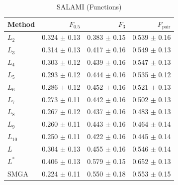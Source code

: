 \documentclass{article}
\begin{document}
\begin{table}
\centering
\caption{ SALAMI (Functions)\label{results:salami:func}}
\small
\begin{tabular}{lrrr}
\toprule
Method & $F_{0.5}$ & $F_3$ & $F_\text{pair}$\\
\midrule
$L_2$   & 0.324 $\pm$ 0.13 & 0.383 $\pm$ 0.15   & 0.539 $\pm$ 0.16\\
$L_3$   & 0.314 $\pm$ 0.13 & 0.417 $\pm$ 0.16   & 0.549 $\pm$ 0.13\\
$L_4$   & 0.303 $\pm$ 0.12 & 0.439 $\pm$ 0.16   & 0.547 $\pm$ 0.13\\
$L_5$   & 0.293 $\pm$ 0.12 & 0.444 $\pm$ 0.16   & 0.535 $\pm$ 0.12\\
$L_6$   & 0.286 $\pm$ 0.12 & 0.452 $\pm$ 0.16   & 0.521 $\pm$ 0.13\\
$L_7$   & 0.273 $\pm$ 0.11 & 0.442 $\pm$ 0.16   & 0.502 $\pm$ 0.13\\
$L_8$   & 0.267 $\pm$ 0.12 & 0.437 $\pm$ 0.16   & 0.483 $\pm$ 0.13\\
$L_9$   & 0.260 $\pm$ 0.11 & 0.443 $\pm$ 0.16   & 0.464 $\pm$ 0.14\\
$L_{10}$& 0.250 $\pm$ 0.11 & 0.422 $\pm$ 0.16   & 0.445 $\pm$ 0.14\\
\midrule
$L$     & 0.304 $\pm$ 0.13 & 0.455 $\pm$ 0.16   & 0.546 $\pm$ 0.14\\
$L^*$   & 0.406 $\pm$ 0.13 & 0.579 $\pm$ 0.15   & 0.652 $\pm$ 0.13\\
\midrule
SMGA    & 0.224 $\pm$ 0.11 & 0.550 $\pm$ 0.18   & 0.553 $\pm$ 0.15\\
\bottomrule
\end{tabular}
\end{table}
\end{document}
